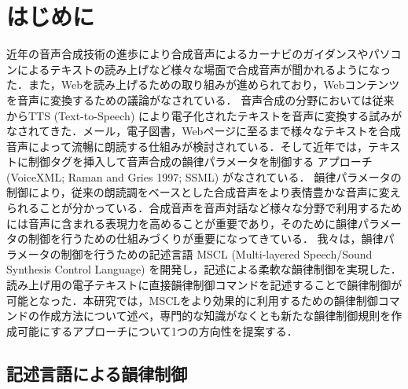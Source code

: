 \documentclass[japanese]{jnlp_1.4}
\begin{document}
\maketitle


\section{はじめに}

近年の音声合成技術の進歩により合成音声によるカーナビのガイダンスやパソコンによるテキストの読み上げなど様々な場面で合成音声が聞かれるようになった．また，Webを読み上げるための取り組みが進められており，Webコンテンツを音声に変換するための議論がなされている\cite{SOUMU,Guidance,Dialogue}．
音声合成の分野においては従来からTTS (Text-to-Speech) \cite{MITalk,TTS}により電子化されたテキストを音声に変換する試みがなされてきた．メール，電子図書，Webページに至るまで様々なテキストを合成音声によって流暢に朗読する仕組みが検討されている．そして近年では，テキストに制御タグを挿入して音声合成の韻律パラメータを制御する
    アプローチ (VoiceXML; Raman and Gries 1997; SSML) がなされている．\nocite{VoiceXML,Raman,SSML}
韻律パラメータの制御により，従来の朗読調をベースとした合成音声をより表情豊かな音声に変えられることが分かっている．合成音声を音声対話など様々な分野で利用するためには音声に含まれる表現力を高めることが重要であり，そのために韻律パラメータの制御を行うための仕組みづくりが重要になってきている．
我々は，韻律パラメータの制御を行うための記述言語 MSCL (Multi-layered Speech/Sound Synthesis Control Language) \cite{MSCL}を開発し，記述による柔軟な韻律制御を実現した．読み上げ用の電子テキストに直接韻律制御コマンドを記述することで韻律制御が可能となった．本研究では，MSCLをより効果的に利用するための韻律制御コマンドの作成方法について述べ，専門的な知識がなくとも新たな韻律制御規則を作成可能にするアプローチについて1つの方向性を提案する．


\subsection{記述言語による韻律制御}
\end{document}
